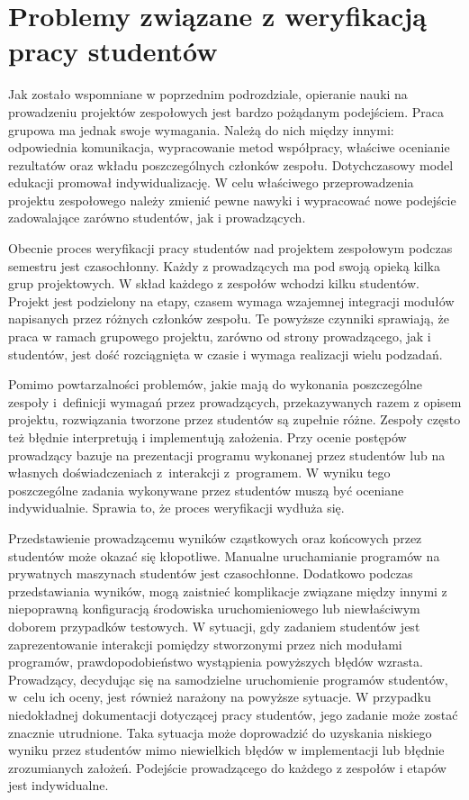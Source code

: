 \section{Problemy związane z weryfikacją pracy studentów}

Jak zostało wspomniane w poprzednim podrozdziale, opieranie nauki na prowadzeniu projektów zespołowych jest bardzo pożądanym podejściem.
Praca grupowa ma jednak swoje wymagania.
Należą do nich między innymi: odpowiednia komunikacja, wypracowanie metod współpracy, właściwe ocenianie rezultatów oraz wkładu poszczególnych członków zespołu.
Dotychczasowy model edukacji promował indywidualizację.
W celu właściwego przeprowadzenia projektu zespołowego należy zmienić pewne nawyki i wypracować nowe podejście zadowalające zarówno studentów, jak i prowadzących.

Obecnie proces weryfikacji pracy studentów nad projektem zespołowym podczas semestru jest czasochłonny.
Każdy z prowadzących ma pod swoją opieką kilka grup projektowych.
W skład każdego z zespołów wchodzi kilku studentów.
Projekt jest podzielony na etapy, czasem wymaga wzajemnej integracji modułów napisanych przez różnych członków zespołu.
Te powyższe czynniki sprawiają, że praca w ramach grupowego projektu, zarówno od strony prowadzącego, jak i studentów, jest dość rozciągnięta w czasie i wymaga realizacji wielu podzadań.

Pomimo powtarzalności problemów, jakie mają do wykonania poszczególne zespoły i~definicji wymagań przez prowadzących, przekazywanych razem z opisem projektu, rozwiązania tworzone przez studentów są zupełnie różne.
Zespoły często też błędnie interpretują i implementują założenia.
Przy ocenie postępów prowadzący bazuje na prezentacji programu wykonanej przez studentów lub na własnych doświadczeniach z~interakcji z~programem.
W wyniku tego poszczególne zadania wykonywane przez studentów muszą być oceniane indywidualnie.
Sprawia to, że proces weryfikacji wydłuża się.

Przedstawienie prowadzącemu wyników cząstkowych oraz końcowych przez studentów może okazać się kłopotliwe.
Manualne uruchamianie programów na prywatnych maszynach studentów jest czasochłonne.
Dodatkowo podczas przedstawiania wyników, mogą zaistnieć komplikacje związane między innymi z niepoprawną konfiguracją środowiska uruchomieniowego lub niewłaściwym doborem przypadków testowych.
W sytuacji, gdy zadaniem studentów jest zaprezentowanie interakcji pomiędzy stworzonymi przez nich modułami programów, prawdopodobieństwo wystąpienia powyższych błędów wzrasta.
Prowadzący, decydując się na samodzielne uruchomienie programów studentów, w~celu ich oceny, jest również narażony na powyższe sytuacje.
W przypadku niedokładnej dokumentacji dotyczącej pracy studentów, jego zadanie może zostać znacznie utrudnione.
Taka sytuacja może doprowadzić do uzyskania niskiego wyniku przez studentów mimo niewielkich błędów w implementacji lub błędnie zrozumianych założeń.
Podejście prowadzącego do każdego z zespołów i etapów jest indywidualne.

